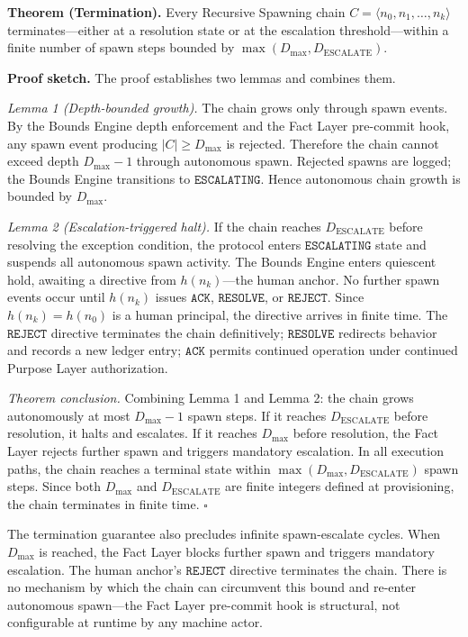 \medskip
\noindent\textbf{Theorem (Termination).} Every Recursive Spawning chain $C = \langle n_0, n_1, \ldots, n_k \rangle$ terminates---either at a resolution state or at the escalation threshold---within a finite number of spawn steps bounded by $\max(D_{\mathrm{max}}, D_{\mathrm{ESCALATE}})$.

\medskip
\noindent\textbf{Proof sketch.} The proof establishes two lemmas and combines them.

\medskip
\textit{Lemma 1 (Depth-bounded growth).} The chain grows only through spawn events. By the Bounds Engine depth enforcement and the Fact Layer pre-commit hook, any spawn event producing $|C| \geq D_{\mathrm{max}}$ is rejected. Therefore the chain cannot exceed depth $D_{\mathrm{max}} - 1$ through autonomous spawn. Rejected spawns are logged; the Bounds Engine transitions to $\texttt{ESCALATING}$. Hence autonomous chain growth is bounded by $D_{\mathrm{max}}$.

\medskip
\textit{Lemma 2 (Escalation-triggered halt).} If the chain reaches $D_{\mathrm{ESCALATE}}$ before resolving the exception condition, the protocol enters $\texttt{ESCALATING}$ state and suspends all autonomous spawn activity. The Bounds Engine enters quiescent hold, awaiting a directive from $h(n_k)$---the human anchor. No further spawn events occur until $h(n_k)$ issues $\texttt{ACK}$, $\texttt{RESOLVE}$, or $\texttt{REJECT}$. Since $h(n_k) = h(n_0)$ is a human principal, the directive arrives in finite time. The $\texttt{REJECT}$ directive terminates the chain definitively; $\texttt{RESOLVE}$ redirects behavior and records a new ledger entry; $\texttt{ACK}$ permits continued operation under continued Purpose Layer authorization.

\medskip
\textit{Theorem conclusion.} Combining Lemma 1 and Lemma 2: the chain grows autonomously at most $D_{\mathrm{max}} - 1$ spawn steps. If it reaches $D_{\mathrm{ESCALATE}}$ before resolution, it halts and escalates. If it reaches $D_{\mathrm{max}}$ before resolution, the Fact Layer rejects further spawn and triggers mandatory escalation. In all execution paths, the chain reaches a terminal state within $\max(D_{\mathrm{max}}, D_{\mathrm{ESCALATE}})$ spawn steps. Since both $D_{\mathrm{max}}$ and $D_{\mathrm{ESCALATE}}$ are finite integers defined at provisioning, the chain terminates in finite time. $\square$

The termination guarantee also precludes infinite spawn-escalate cycles. When $D_{\mathrm{max}}$ is reached, the Fact Layer blocks further spawn and triggers mandatory escalation. The human anchor's $\texttt{REJECT}$ directive terminates the chain. There is no mechanism by which the chain can circumvent this bound and re-enter autonomous spawn---the Fact Layer pre-commit hook is structural, not configurable at runtime by any machine actor.

